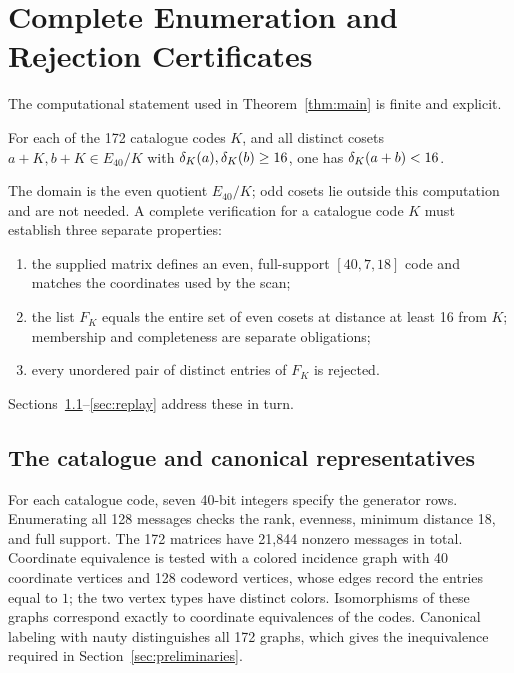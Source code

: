 \section{Complete Enumeration and Rejection Certificates}
\label{sec:computation}
The computational statement used in Theorem~\ref{thm:main} is finite and explicit.
\begin{proposition}\label{prop:computed}
For each of the 172 catalogue codes $K$, and all distinct cosets $a+K,b+K\in E_{40}/K$ with $\delta_K(a),\delta_K(b)\ge16$, one has $\delta_K(a+b)<16$.
\end{proposition}
The domain is the even quotient $E_{40}/K$; odd cosets lie outside this computation and are not needed. A complete verification for a catalogue code $K$ must establish three separate properties:
\begin{enumerate}
\item the supplied matrix defines an even, full-support $[40,7,18]$ code and matches the coordinates used by the scan;
\item the list $F_K$ equals the entire set of even cosets at distance at least 16 from $K$; membership and completeness are separate obligations;
\item every unordered pair of distinct entries of $F_K$ is rejected.
\end{enumerate}
Sections~\ref{sec:catalogue}--\ref{sec:replay} address these in turn.

\subsection{The catalogue and canonical representatives}\label{sec:catalogue}
For each catalogue code, seven 40-bit integers specify the generator rows. Enumerating all 128 messages checks the rank, evenness, minimum distance 18, and full support. The 172 matrices have 21,844 nonzero messages in total. Coordinate equivalence is tested with a colored incidence graph with 40 coordinate vertices and 128 codeword vertices, whose edges record the entries equal to $1$; the two vertex types have distinct colors. Isomorphisms of these graphs correspond exactly to coordinate equivalences of the codes. Canonical labeling with nauty \citep{mckay2014} distinguishes all 172 graphs, which gives the inequivalence required in Section~\ref{sec:preliminaries}.

